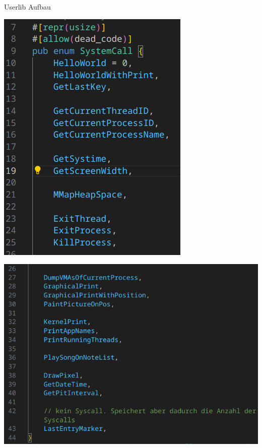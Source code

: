 \begin{frame}{Userlib Aufbau}
    \begin{minipage}[t]{0.3\textwidth}
        \includegraphics[height=0.8\textheight]{fig/Code Screens/Enum1.png} 
    \end{minipage}
    \hfill
    \begin{minipage}[t]{0.65\textwidth}
        \includegraphics[height=0.8\textheight]{fig/Code Screens/Enum2.png} 
    \end{minipage}
\end{frame}